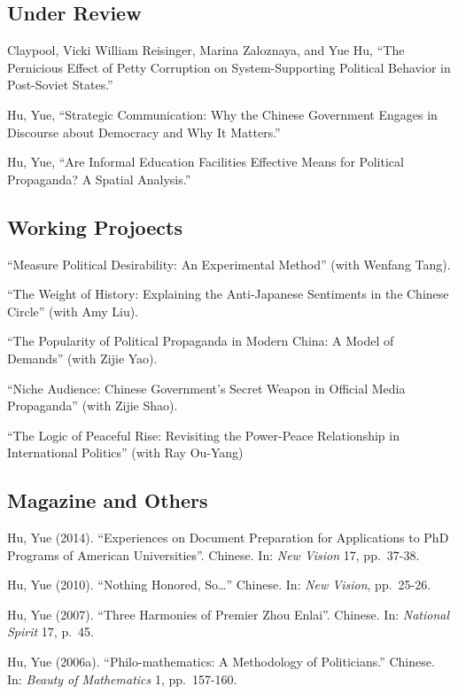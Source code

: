 \documentclass[10.5pt,]{article}
\begin{document}
\subsection{Under Review}\label{under-review}

Claypool, Vicki William Reisinger, Marina Zaloznaya, and Yue Hu, ``The
Pernicious Effect of Petty Corruption on System-Supporting Political
Behavior in Post-Soviet States.''

Hu, Yue, ``Strategic Communication: Why the Chinese Government Engages
in Discourse about Democracy and Why It Matters.''

Hu, Yue, ``Are Informal Education Facilities Effective Means for
Political Propaganda? A Spatial Analysis.''

\subsection{Working Projoects}\label{working-projoects}

``Measure Political Desirability: An Experimental Method'' (with Wenfang
Tang).

``The Weight of History: Explaining the Anti-Japanese Sentiments in the
Chinese Circle'' (with Amy Liu).

``The Popularity of Political Propaganda in Modern China: A Model of
Demands'' (with Zijie Yao).

``Niche Audience: Chinese Government's Secret Weapon in Official Media
Propaganda'' (with Zijie Shao).

``The Logic of Peaceful Rise: Revisiting the Power-Peace Relationship in
International Politics'' (with Ray Ou-Yang)

\subsection{Magazine and Others}\label{magazine-and-others}

Hu, Yue (2014). ``Experiences on Document Preparation for Applications
to PhD Programs of American Universities''. Chinese. In: \emph{New
Vision} 17, pp.~37-38.

Hu, Yue (2010). ``Nothing Honored, So\ldots{}'' Chinese. In: \emph{New
Vision}, pp.~25-26.

Hu, Yue (2007). ``Three Harmonies of Premier Zhou Enlai''. Chinese. In:
\emph{National Spirit} 17, p.~45.

Hu, Yue (2006a). ``Philo-mathematics: A Methodology of Politicians.''
Chinese. In: \emph{Beauty of Mathematics} 1, pp.~157-160.
\end{document}
